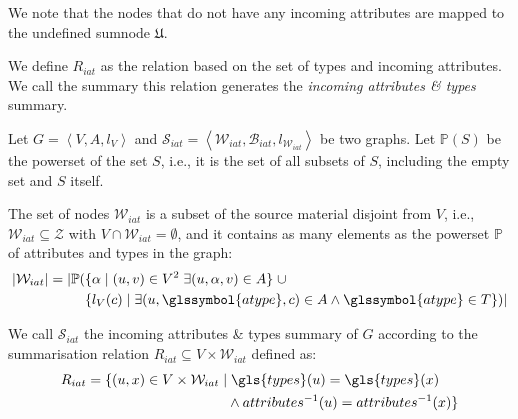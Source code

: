 \begin{remark}
We note that the nodes that do not have any incoming attributes are mapped to the undefined sumnode $\mathfrak{U}$.
\end{remark}

\vspace{.5cm}


We define $R_{iat}$ as the relation based on the set of \gls{types} and incoming \gls{attributes}. We call the summary this relation generates the \emph{incoming attributes \& types} summary.

\begin{definition}
	Let $G=\left\langle V, A, l_V \right\rangle$ and $\mathcal{S}_{iat} = \left\langle \mathcal{W}_{iat}, \mathcal{B}_{iat}, l_{\mathcal{W}_{iat}} \right\rangle$ be two graphs. Let $\mathbb{P}(S)$ be the powerset of the set $S$, i.e., it is the set of all subsets of $S$, including the empty set and $S$ itself.

	The set of nodes $\mathcal{W}_{iat}$ is a subset of the source material disjoint from $V$, i.e., $\mathcal{W}_{iat} \subseteq \mathcal{Z}$ with $V \cap \mathcal{W}_{iat} = \emptyset$, and it contains as many elements as the powerset $\mathbb{P}$ of attributes and types in the graph:
	$$
	\begin{aligned}
	\lvert \mathcal{W}_{iat} \rvert = \lvert \mathbb{P} ( & \{ \alpha \mid (u, v) \in V^2\; \exists (u, \alpha, v) \in A \} \;\cup \\
	& \{ l_V(c) \mid \exists (u, \glssymbol{atype}, c) \in A \wedge \glssymbol{atype} \in T \} ) \rvert
	\end{aligned}
	$$

	We call $\mathcal{S}_{iat}$ the incoming attributes \& types summary of $G$ according to the summarisation relation $R_{iat} \subseteq V \times \mathcal{W}_{iat}$ defined as:
	$$
	\begin{aligned}
		R_{iat} = \{ (u, x) \in V \times \mathcal{W}_{iat} \mid &\; \gls{types}(u) = \gls{types}(x) \\
	& \wedge attributes^{-1}(u) = attributes^{-1}(x) \}
	\end{aligned}
	$$
	\label{chap4:summary:def:incoming-attributes-types}
\end{definition}
\vspace{.5cm}


